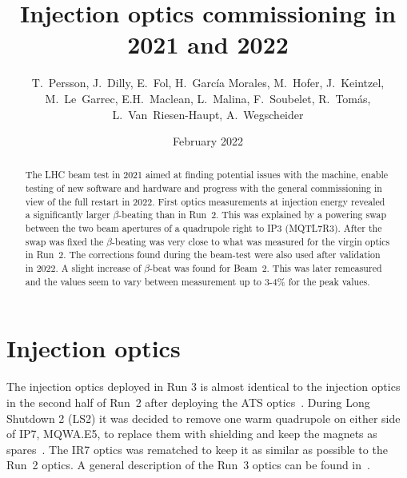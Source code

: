 \documentclass[a4paper]{cernatsnote}
\title{Injection optics commissioning in 2021 and 2022}
\author{ T.~Persson, J.~Dilly, E.~Fol, H.~Garc\'ia Morales, M.~Hofer,
 J.~Keintzel, M.~Le~Garrec, E.H.~Maclean, L.~Malina,  F.~Soubelet, R.~Tom\'as, L.~Van~Riesen-Haupt,  A.~Wegscheider}
\date{February 2022}
\begin{document}
\maketitle
\begin{abstract}
The LHC beam test in 2021 aimed at finding potential issues with the machine, enable testing of new software and hardware and progress with the general commissioning in view of the full restart in 2022.
First optics measurements at injection energy revealed a significantly larger $\beta$-beating than in Run~2. 
This was explained by a powering swap between the two beam apertures of a quadrupole right to IP3 (MQTL7R3). After the swap was fixed the $\beta$-beating was very close to what was measured for the virgin optics in Run~2. The corrections found during the beam-test were also used after validation in 2022. A slight increase of $\beta$-beat was found for Beam~2. This was later remeasured and the values seem to vary between measurement up to 3-4\% for the peak values. 

\end{abstract}

\section{Injection optics}
The injection optics deployed in Run 3 is almost identical to the injection optics in the second half of Run~2 after deploying the ATS optics~\cite{ats_stephane}.
During Long Shutdown 2 (LS2) it was decided to remove one warm quadrupole on either side of IP7, MQWA.E5, to replace them with shielding and keep the magnets as spares~\cite{roderik}. The IR7 optics was rematched to
keep it as similar as possible to the Run~2 optics.
A general description of the Run~3 optics can be found in~\cite{run3}.
\end{document}
